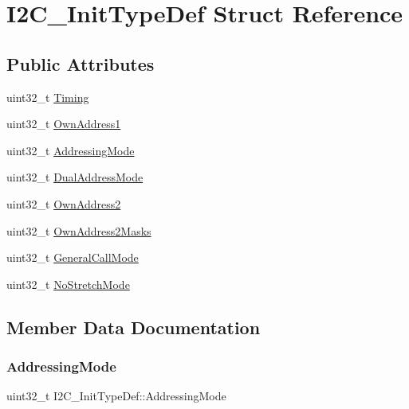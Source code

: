 \hypertarget{struct_i2_c___init_type_def}{}\section{I2\+C\+\_\+\+Init\+Type\+Def Struct Reference}
\label{struct_i2_c___init_type_def}
\subsection*{Public Attributes}
\begin{DoxyCompactItemize}
\item 
uint32\+\_\+t \mbox{\hyperlink{struct_i2_c___init_type_def_a85cf419fd97f82464a6e7396ac0ac1c4}{Timing}}
\item 
uint32\+\_\+t \mbox{\hyperlink{struct_i2_c___init_type_def_abfb610317ea08e85c8feece82ccc9e16}{Own\+Address1}}
\item 
uint32\+\_\+t \mbox{\hyperlink{struct_i2_c___init_type_def_a5c39c41a5ee892c1bce69a579cc017ca}{Addressing\+Mode}}
\item 
uint32\+\_\+t \mbox{\hyperlink{struct_i2_c___init_type_def_add6a6b87ee067d33c94c554288736d40}{Dual\+Address\+Mode}}
\item 
uint32\+\_\+t \mbox{\hyperlink{struct_i2_c___init_type_def_a8165caf61b7b52f903edd7517ddaa06b}{Own\+Address2}}
\item 
uint32\+\_\+t \mbox{\hyperlink{struct_i2_c___init_type_def_a2ac60d8926224856693f49c068533ae1}{Own\+Address2\+Masks}}
\item 
uint32\+\_\+t \mbox{\hyperlink{struct_i2_c___init_type_def_a17ce92b135a4b5c045a5387c91677803}{General\+Call\+Mode}}
\item 
uint32\+\_\+t \mbox{\hyperlink{struct_i2_c___init_type_def_a28afdce458703464638f1a01e04da04e}{No\+Stretch\+Mode}}
\end{DoxyCompactItemize}


\subsection{Member Data Documentation}
\mbox{\label{struct_i2_c___init_type_def_a5c39c41a5ee892c1bce69a579cc017ca}} 
\subsubsection{\texorpdfstring{AddressingMode}{AddressingMode}}
{\footnotesize\ttfamily uint32\+\_\+t I2\+C\+\_\+\+Init\+Type\+Def\+::\+Addressing\+Mode}

